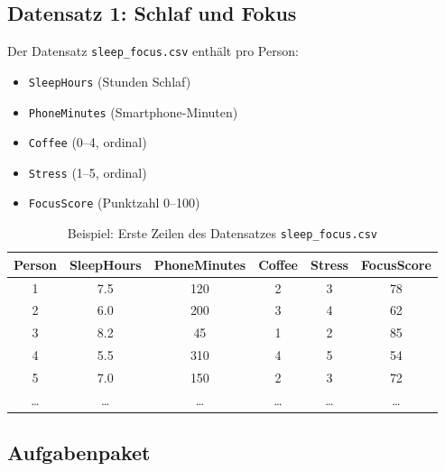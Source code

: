 \subsection{Datensatz 1: Schlaf und Fokus}
Der Datensatz \texttt{sleep\_focus.csv} enthält pro Person:
\begin{itemize}
	\item \texttt{SleepHours} (Stunden Schlaf)
	\item \texttt{PhoneMinutes} (Smartphone-Minuten)
	\item \texttt{Coffee} (0--4, ordinal)
	\item \texttt{Stress} (1--5, ordinal)
	\item \texttt{FocusScore} (Punktzahl 0--100)
\end{itemize}

\begin{table}[H]
	\centering
	\caption{Beispiel: Erste Zeilen des Datensatzes \texttt{sleep\_focus.csv}}
	\small
	\begin{tabular}{c c c c c c}
		\toprule
		\textbf{Person} & \textbf{SleepHours} & \textbf{PhoneMinutes} & \textbf{Coffee} & \textbf{Stress} & \textbf{FocusScore} \\
		\midrule
		1               & 7.5                 & 120                   & 2               & 3               & 78                  \\
		2               & 6.0                 & 200                   & 3               & 4               & 62                  \\
		3               & 8.2                 & 45                    & 1               & 2               & 85                  \\
		4               & 5.5                 & 310                   & 4               & 5               & 54                  \\
		5               & 7.0                 & 150                   & 2               & 3               & 72                  \\
		\dots           & \dots               & \dots                 & \dots           & \dots           & \dots               \\
		\bottomrule
	\end{tabular}
	\label{table:sleep_focus_example}
\end{table}

\subsection{Aufgabenpaket}

